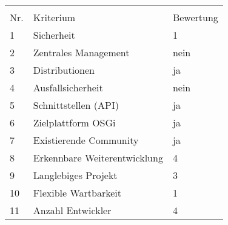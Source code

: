 \begin{table}[H]
\begin{framed}
\begin{tabular}{l|l|l|l}
  \multicolumn{4}{l}{} \\
  
  Nr. &  \multicolumn{2}{l|}{Kriterium} & Bewertung \\
  \midrule
  1 & \multicolumn{2}{l|}{Sicherheit}
  & 1 \\
  
  2 & \multicolumn{2}{l|}{Zentrales Management}
  & nein \\
  
  3 & \multicolumn{2}{l|}{Distributionen}
  & ja \\
  
  4 & \multicolumn{2}{l|}{Ausfallsicherheit}
  & nein \\
  
  5 & \multicolumn{2}{l|}{Schnittstellen (\ac{API})}
  & ja \\
  
  6 & \multicolumn{2}{l|}{Zielplattform OSGi}
  & ja \\
  
  7 & \multicolumn{2}{l|}{Existierende Community}
  & ja \\
  
  8 & \multicolumn{2}{l|}{Erkennbare Weiterentwicklung}
  & 4 \\
  
  9 & \multicolumn{2}{l|}{Langlebiges Projekt}
  & 3 \\
  
  10 & \multicolumn{2}{l|}{Flexible Wartbarkeit}
  & 1 \\
  
  11 & \multicolumn{2}{l|}{Anzahl Entwickler}
  & 4 \\
  \bottomrule
 \end{tabular}
 \label{tab:rating_karaf}
 \end{framed}
\end{table}

